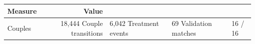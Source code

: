 \begin{tabular}{l
r
}
\toprule
Measure & Value
\\
\midrule
Couples & 18,444
Couple transitions & 6,042
Treatment events & 69
Validation matches & 16 / 16
\\
\bottomrule
\end{tabular}
